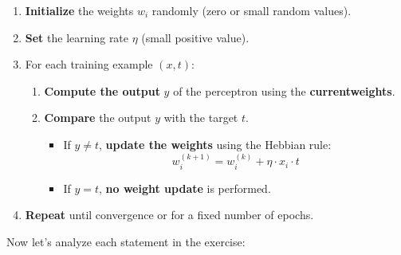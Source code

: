 \begin{enumerate}
    \item \textbf{Initialize} the weights $w_i$ randomly (zero or small random values).
    \item \textbf{Set} the learning rate $\eta$ (small positive value).
    \item For each training example $(x, t)$:
        \begin{enumerate}
            \item \textbf{Compute the output} $y$ of the perceptron using the \textbf{current\break weights}.
            \item \textbf{Compare} the output $y$ with the target $t$.
                \begin{itemize}
                    \item If $y \neq t$, \textbf{update the weights} using the Hebbian rule:
                        \begin{equation*}
                            w_{i}^{(k+1)} = w_i^{(k)} + \eta \cdot x_i \cdot t
                        \end{equation*}
                    \item If $y = t$, \textbf{no weight update} is performed.
                \end{itemize}
        \end{enumerate}
    \item \textbf{Repeat} until convergence or for a fixed number of epochs.
\end{enumerate}
Now let's analyze each statement in the exercise:
